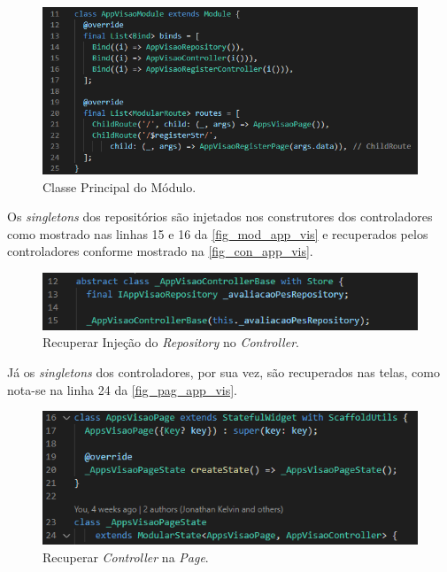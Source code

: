 \begin{figure}[htb]
    \caption{\label{fig_mod_app_vis}Classe Principal do Módulo.}
    \begin{center}
        \includegraphics[scale=0.7]{Imagens/desenvolvimento/app_visao_module.png}
    \end{center}
\end{figure}

Os \emph{singletons} dos repositórios são injetados nos construtores dos controladores como mostrado nas linhas 15
e 16 da \autoref{fig_mod_app_vis} e recuperados pelos controladores conforme mostrado na \autoref{fig_con_app_vis}.

\begin{figure}[htb]
    \caption{\label{fig_con_app_vis}Recuperar Injeção do \emph{Repository} no \emph{Controller}.}
    \begin{center}
        \includegraphics[scale=0.9]{Imagens/desenvolvimento/app_visao_controller.png}
    \end{center}
\end{figure}

Já os \emph{singletons} dos controladores, por sua vez, são recuperados nas telas,
como nota-se na linha 24 da \autoref{fig_pag_app_vis}.

\begin{figure}[htb]
    \caption{\label{fig_pag_app_vis}Recuperar \emph{Controller} na \emph{Page}.}
    \begin{center}
        \includegraphics[scale=0.9]{Imagens/desenvolvimento/app_visao_page.png}
    \end{center}
\end{figure}